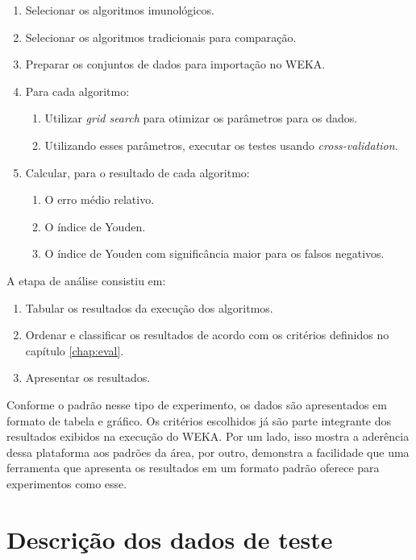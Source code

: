 \begin{enumerate}
    \item Selecionar os algoritmos imunológicos.
    \item Selecionar os algoritmos tradicionais para comparação.
    \item Preparar os conjuntos de dados para importação no WEKA.
    \item Para cada algoritmo:
        \begin{enumerate}
            \item Utilizar \emph{grid search} para otimizar os parâmetros para os dados.
            \item Utilizando esses parâmetros, executar os testes usando \emph{cross-validation}.
        \end{enumerate}
    \item Calcular, para o resultado de cada algoritmo:
        \begin{enumerate}
            \item O erro médio relativo.
            \item O índice de Youden.
            \item O índice de Youden com significância maior para os falsos negativos.
        \end{enumerate}
\end{enumerate}

A etapa de análise consistiu em:

\begin{enumerate}
    \item Tabular os resultados da execução dos algoritmos.
    \item Ordenar e classificar os resultados de acordo com os critérios definidos no capítulo \ref{chap:eval}.
    \item Apresentar os resultados.
\end{enumerate}

Conforme o padrão nesse tipo de experimento, os dados são apresentados em formato de tabela e gráfico. Os critérios escolhidos já são parte integrante dos resultados exibidos na execução do WEKA. Por um lado, isso mostra a aderência dessa plataforma aos padrões da área, por outro, demonstra a facilidade que uma ferramenta que apresenta os resultados em um formato padrão oferece para experimentos como esse.

\section{Descrição dos dados de teste}

